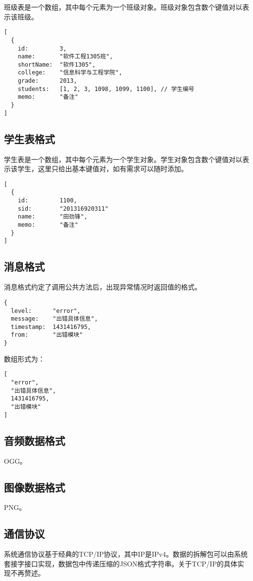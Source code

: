\documentclass[cs4size,a4paper,nofonts]{ctexart}
\begin{document}
班级表是一个数组，其中每个元素为一个班级对象。班级对象包含数个键值对以表示该班级。

\begin{Verbatim}
[
  {
    id:         3,
    name:       "软件工程1305班",
    shortName:  "软件1305",
    college:    "信息科学与工程学院",
    grade:      2013,
    students:   [1, 2, 3, 1098, 1099, 1100], // 学生编号
    memo:       "备注"
  }
]
\end{Verbatim}

\subsection{学生表格式}\label{sec:学生表格式}

学生表是一个数组，其中每个元素为一个学生对象。学生对象包含数个键值对以表示该学生，这里只给出基本键值对，如有需求可以随时添加。

\begin{Verbatim}
[
  {
    id:         1100,
    sid:        "201316920311"
    name:       "田劲锋",
    memo:       "备注"
  }
]
\end{Verbatim}

\subsection{消息格式}\label{sec:消息格式}

消息格式约定了调用公共方法后，出现异常情况时返回值的格式。

\begin{Verbatim}
{
  level:      "error",
  message:    "出错具体信息",
  timestamp:  1431416795,
  from:       "出错模块"
}
\end{Verbatim}

数组形式为：

\begin{Verbatim}
[
  "error",
  "出错具体信息",
  1431416795,
  "出错模块"
]
\end{Verbatim}





\subsection{音频数据格式}\label{sec:音频数据格式}

OGG。

\subsection{图像数据格式}\label{sec:图像数据格式}

PNG。

\subsection{通信协议}\label{sec:通信协议}

系统通信协议基于经典的TCP/IP协议，其中IP是IPv4。数据的拆解包可以由系统套接字接口实现，数据包中传递压缩的JSON格式字符串。关于TCP/IP的具体实现不再赘述。
\end{document}
